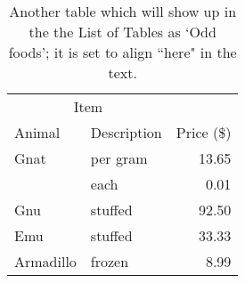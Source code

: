 \begin{table}[h]
	\centering
	\begin{tabular}{llr}
	\hline
	\multicolumn{2}{c}{Item} \\
	\cline{1-2}
	Animal & Description & Price (\$) \\
	\hline
	Gnat  & per gram & 13.65 \\
	 & each     &  0.01 \\
	Gnu   & stuffed  & 92.50 \\
	Emu   & stuffed  & 33.33 \\
	Armadillo & frozen & 8.99 \\
	\hline
	\end{tabular}
	\caption[Odd foods]{Another table which will show up in the the List of Tables as `Odd foods'; it is set to align ``here" in the text.}
\end{table}




